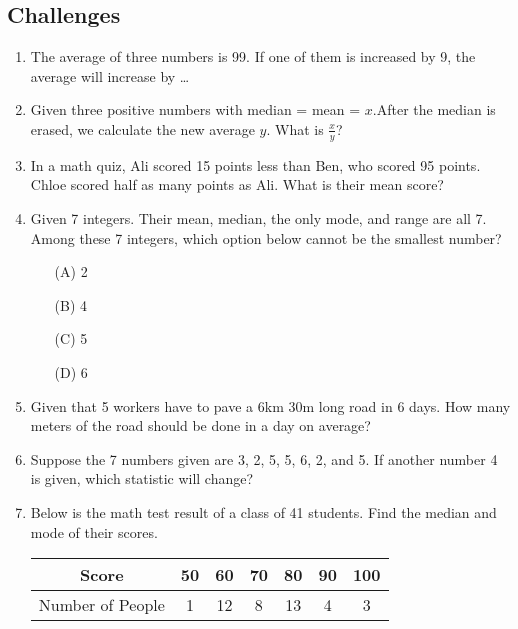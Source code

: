 \documentclass[11pt]{scrartcl}
\begin{document}
\subsection{Challenges}
\begin{enumerate}[resume]
    \item The average of three numbers is 99. If one of them is increased by 9, the average will increase by \ldots

    \vspace{7.5cm} \item Given three positive numbers with median = mean = $x$.After the median is erased, we calculate the new average $y$. What is $\frac{x}{y}$?
    
    \vspace{7.5cm} \item In a math quiz, Ali scored 15 points less than Ben, who scored 95 points. Chloe scored half as many points as Ali. What is their mean score?

    \vspace{7.5cm} \item Given 7 integers. Their mean, median, the only mode, and range are all 7. Among these 7 integers, which option below cannot be the smallest number?
    \begin{enumerate}
       \item[(A)] 2
       \item[(B)] 4
       \item[(C)] 5
       \item[(D)] 6
   \end{enumerate}


    \vspace{7.5cm} \item Given that 5 workers have to pave a 6km 30m long road in 6 days. How many meters of the road should be done in a day on average?

    \vspace{7.5cm} \item Suppose the 7 numbers given are 3, 2, 5, 5, 6, 2, and 5. If another number 4 is given, which statistic will change?
    
    \vspace{7.5cm} \item Below is the math test result of a class of 41 students. Find the median and mode of their scores.\\
        \begin{tabular}{c|cccccc}
            \hline
            Score & 50 & 60 & 70 & 80 & 90 & 100\\
            \hline
            Number of People & 1 & 12 & 8 & 13 & 4 & 3\\
            \hline
        \end{tabular}


\end{enumerate}
\end{document}
